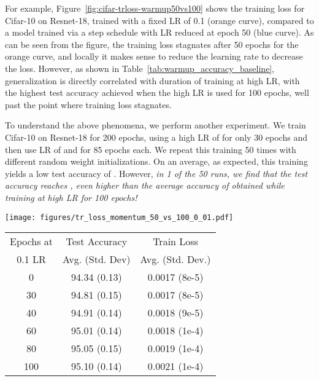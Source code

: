 \documentclass{article} \usepackage{iclr2021_conference,times}
\begin{document}
For example, Figure~\ref{fig:cifar-trloss-warmup50vs100} shows the training loss for Cifar-10 on Resnet-18, trained with a fixed LR of 0.1 (orange curve), compared to a model trained via a step schedule with LR reduced at epoch 50 (blue curve). As can be seen from the figure, the training loss stagnates after  50 epochs for the orange curve, and locally it makes sense to reduce the learning rate to decrease the loss. However, as shown in Table~\ref{tab:warmup_accuracy_baseline}, generalization is directly correlated with duration of training at high LR, with the highest test accuracy achieved when the high LR is used for 100 epochs, well past the point where training loss stagnates.

To understand the above phenomena, we perform another experiment. We train Cifar-10 on Resnet-18 for 200 epochs, using a high LR of  for only 30 epochs and then use LR of  and  for 85 epochs each. We repeat this training 50 times with different random weight initializations. On an average, as expected, this training yields a low test accuracy of . However, {\it in 1 of the 50 runs, we find that the test accuracy reaches , even higher than the average accuracy of  obtained while training at high LR for 100 epochs!}

\begin{figure*}[t]
\begin{minipage}{0.4\textwidth}
  \centering
  \texttt{[image: figures/tr\_loss\_momentum\_50\_vs\_100\_0\_01.pdf]}
  \caption{Training loss for Cifar-10 on Resnet-18. Orange plot uses a fixed LR of 0.1, while in blue plot, the LR is reduced from 0.1 to 0.01 at epoch 50.
  }
  \label{fig:cifar-trloss-warmup50vs100}
\end{minipage}
\hfil
\begin{minipage}{0.5\textwidth}
  \centering
  \small
  \captionsetup{type=table} \vspace{-12pt}
  \caption{Cifar-10 on Resnet-18 trained for 200 epochs with Momentum. An LR of 0.1 is used for the explore epochs. Half the remaining epochs are trained at 0.01 and the other half at 0.001. Reported results are average over 4 runs.}
\begin{tabular}{ccc}
\toprule
Epochs at & Test Accuracy & Train Loss \\ 
0.1 LR &  Avg. (Std. Dev) &  Avg. (Std. Dev.)\\
\midrule
    0 & 94.34 (0.13) & 0.0017 (8e-5) \\
    30 & 94.81 (0.15) & 0.0017 (8e-5) \\
    40 & 94.91 (0.14) & 0.0018 (9e-5) \\
    60 & 95.01 (0.14) & 0.0018 (1e-4) \\ 
    80 & 95.05 (0.15)  & 0.0019 (1e-4) \\
    100 & 95.10 (0.14)  & 0.0021 (1e-4) \\
\bottomrule
\end{tabular}
  \label{tab:warmup_accuracy_baseline}
\end{minipage}
\vspace*{-0.3in}
\end{figure*}
\end{document}
